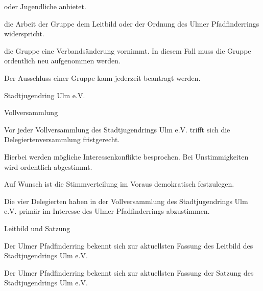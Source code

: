 \begin{legal}
\begin{legal}
\begin{legal}
\begin{legal}
                                  oder Jugendliche anbietet.
                            \item die Arbeit der Gruppe dem Leitbild oder der Ordnung des Ulmer 
                                  Pfadfinderrings widerspricht.
                            \item die Gruppe eine Verbandsänderung vornimmt. In diesem Fall muss 
                                  die Gruppe ordentlich neu aufgenommen werden.
                        \end{legal}
                    \item Der Ausschluss einer Gruppe kann jederzeit beantragt werden.
                \end{legal}
        \end{legal}
    \item Stadtjugendring Ulm e.V.
        \begin{legal}
            \item Vollversammlung
                \begin{legal}
                    \item Vor jeder Vollversammlung des Stadtjugendrings Ulm e.V. trifft sich die 
                          Delegiertenversammlung fristgerecht.
                    \item Hierbei werden mögliche Interessenkonflikte besprochen.
                          Bei Unstimmigkeiten wird ordentlich abgestimmt.
                    \item Auf Wunsch ist die Stimmverteilung im Voraus demokratisch festzulegen.
                    \item Die vier Delegierten haben in der Vollversammlung des 
                          Stadtjugendrings Ulm e.V. primär im Interesse des Ulmer Pfadfinderrings 
                          abzustimmen.
                \end{legal}
            \item Leitbild und Satzung
                \begin{legal}
                    \item Der Ulmer Pfadfinderring bekennt sich zur aktuellsten Fassung 
                          des Leitbild des Stadtjugendrings Ulm e.V.
                    \item Der Ulmer Pfadfinderring bekennt sich zur aktuellsten Fassung der 
                          Satzung des Stadtjugendrings Ulm e.V.
                \end{legal}

\end{legal}
\end{legal}
